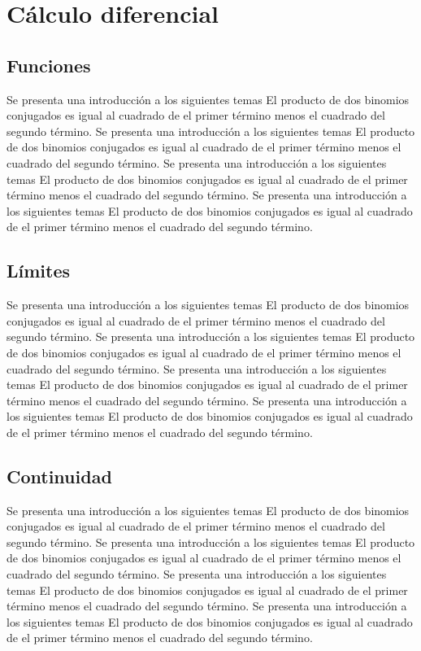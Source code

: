 \chapter{Cálculo diferencial}
\section{Funciones}
Se presenta una introducción a los siguientes temas El producto de dos binomios conjugados es igual al cuadrado de el primer término menos el cuadrado del segundo término.\cite{Golgoon2017}
Se presenta una introducción a los siguientes temas El producto de dos binomios conjugados es igual al cuadrado de el primer término menos el cuadrado del segundo término.
Se presenta una introducción a los siguientes temas El producto de dos binomios conjugados es igual al cuadrado de el primer término menos el cuadrado del segundo término.\cite{Yang2017}
Se presenta una introducción a los siguientes temas El producto de dos binomios conjugados es igual al cuadrado de el primer término menos el cuadrado del segundo término.\cite{Gomes2015b,Altshuler2014} 

\section{Límites}
Se presenta una introducción a los siguientes temas El producto de dos binomios conjugados es igual al cuadrado de el primer término menos el cuadrado del segundo término.\cite{Lavendhomme1996,burden2002analisis}
Se presenta una introducción a los siguientes temas El producto de dos binomios conjugados es igual al cuadrado de el primer término menos el cuadrado del segundo término.
Se presenta una introducción a los siguientes temas El producto de dos binomios conjugados es igual al cuadrado de el primer término menos el cuadrado del segundo término.
Se presenta una introducción a los siguientes temas El producto de dos binomios conjugados es igual al cuadrado de el primer término menos el cuadrado del segundo término.

\section{Continuidad}
Se presenta una introducción a los siguientes temas El producto de dos binomios conjugados es igual al cuadrado de el primer término menos el cuadrado del segundo término.
Se presenta una introducción a los siguientes temas El producto de dos binomios conjugados es igual al cuadrado de el primer término menos el cuadrado del segundo término.
Se presenta una introducción a los siguientes temas El producto de dos binomios conjugados es igual al cuadrado de el primer término menos el cuadrado del segundo término.
Se presenta una introducción a los siguientes temas El producto de dos binomios conjugados es igual al cuadrado de el primer término menos el cuadrado del segundo término.

